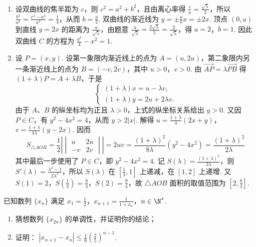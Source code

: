 \begin{solution}
\begin{enumerate}
\item 设双曲线的焦半距为 \(c\)，则 \(c^{2}=a^{2}+b^{2}\)，且由离心率得 \(\frac{c}{a}=\frac{\sqrt{5}}{2}\)，所以 \(\frac{b^{2}}{a^{2}}=\frac{c^{2}-a^{2}}{a^{2}}=\frac{1}{4}\)，从而 \(b=\frac{a}{2}\). 双曲线的渐近线为 \(y=\pm\frac{a}{b}x=\pm2x\). 顶点 \(\left(0,a\right)\) 到直线 \(y=2x\) 的距离为 \(\frac{a}{\sqrt{5}}\)，由题意 \(\frac{a}{\sqrt{5}}=\frac{2\sqrt{5}}{5}=\frac{2}{\sqrt{5}}\)，得 \(a=2\)，\(b=1\). 因此双曲线 \(C\) 的方程为 \(\frac{y^{2}}{4}-x^{2}=1\).
\item 设 \(P=\left(x,y\right)\). 设第一象限内渐近线上的点为 \(A=\left(u,2u\right)\)，第二象限内另一条渐近线上的点为 \(B=\left(-v,2v\right)\)，其中 \(u>0\)，\(v>0\). 由 \(\overrightarrow{AP}=\lambda\overrightarrow{PB}\) 得 \(\left(1+\lambda\right)P=A+\lambda B\)，于是
\[
\begin{cases}
\left(1+\lambda\right)x=u-\lambda v,\\
\left(1+\lambda\right)y=2u+2\lambda v.
\end{cases}
\]
由于 \(A\)、\(B\) 的纵坐标均为正且 \(\lambda>0\)，上式的纵坐标关系给出 \(y>0\). 又因 \(P\in C\)，有 \(y^{2}-4x^{2}=4\)，从而 \(y>2|x|\).
解得 \(u=\frac{1+\lambda}{4}\left(2x+y\right)\)，\(v=\frac{1+\lambda}{4\lambda}\left(y-2x\right)\). 因而
\[
S_{\triangle AOB}=\frac{1}{2}\left|\begin{vmatrix}u&2u\\-v&2v\end{vmatrix}\right|=2uv=\frac{\left(1+\lambda\right)^{2}}{8\lambda}\left(y^{2}-4x^{2}\right)=\frac{\left(1+\lambda\right)^{2}}{2\lambda}
\]
其中最后一步使用了 \(P\in C\)，即 \(y^{2}-4x^{2}=4\). 记 \(S\left(\lambda\right)=\frac{\left(1+\lambda\right)^{2}}{2\lambda}\)，则 \(S'\left(\lambda\right)=\frac{\lambda^{2}-1}{2\lambda^{2}}\)，所以 \(S\left(\lambda\right)\) 在 \(\left[\frac{1}{3},1\right]\) 上递减，在 \([1,2]\) 上递增. 又 \(S\left(1\right)=2\)，\(S\left(\frac{1}{3}\right)=\frac{8}{3}\)，\(S\left(2\right)=\frac{9}{4}\)，故 \(\triangle AOB\) 面积的取值范围为 \(\left[2,\frac{8}{3}\right]\).
\end{enumerate}
\end{solution}

\begin{problem}
已知数列 \(\{x_{n}\}\) 满足 \(x_{1} = \frac{1}{2}\)，\(x_{n + 1} = \frac{1}{1 + x_n}\)，\(n \in \N^*\).

\begin{enumerate}
\item 猜想数列 \( \{x_{2n}\} \) 的单调性，并证明你的结论；
\item 证明： \( \left|x_{n+1}-x_{n}\right|\leqslant\frac{1}{6}\left(\frac{2}{5}\right)^{n-1} \).
\end{enumerate}
\end{problem}

